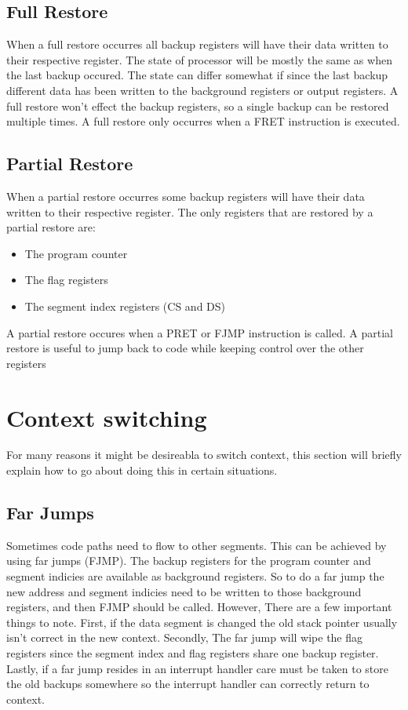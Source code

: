 \documentclass[oneside, a4paper]{memoir}
\begin{document}
\subsection{Full Restore}
When a full restore occurres all backup registers will have their data written to their respective register. The state of processor will be mostly the same as when the last backup occured. The state can differ somewhat if since the last backup different data has been written to the background registers or output registers. A full restore won't effect the backup registers, so a single backup can be restored multiple times. A full restore only occurres when a FRET instruction is executed.
\subsection{Partial Restore}
When a partial restore occurres some backup registers will have their data written to their respective register. The only registers that are restored by a partial restore are:
\begin{itemize}
\item The program counter
\item The flag registers
\item The segment index registers (CS and DS)
\end{itemize}
A partial restore occures when a PRET or FJMP instruction is called. A partial restore is useful to jump back to code while keeping control over the other registers
\section{Context switching}
For many reasons it might be desireabla to switch context, this section will briefly explain how to go about doing this in certain situations.
\subsection{Far Jumps}
Sometimes code paths need to flow to other segments. This can be achieved by using far jumps (FJMP). The backup registers for the program counter and segment indicies are available as background registers. So to do a far jump the new address and segment indicies need to be written to those background registers, and then FJMP should be called. However, There are a few important things to note. First, if the data segment is changed the old stack pointer usually isn't correct in the new context. Secondly, The far jump will wipe the flag registers since the segment index and flag registers share one backup register. Lastly, if a far jump resides in an interrupt handler care must be taken to store the old backups somewhere so the interrupt handler can correctly return to context.
\end{document}
